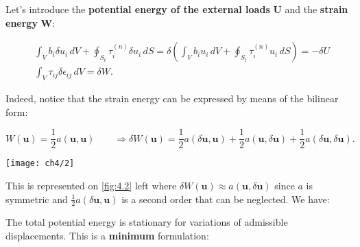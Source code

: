 	Let's introduce the \textbf{potential energy of the external loads} $\bm{U}$ and the \textbf{strain energy} $\bm{W}$:
	
	\begin{equation}
	\begin{aligned}
	&\int _V b_i \delta u_i \, dV +\oint _{S_t} \tau _{i}^{(n)} \delta u_i \, dS = \delta \left( \int _V b_i u_i \, dV +\oint _{S_t} \tau _{i}^{(n)} u_i \, dS \right)= - \delta U \\
	&\int _V \tau _{ij} \delta\epsilon_{ij} \, dV = \delta W.
	\end{aligned}
	\end{equation}
	
	Indeed, notice that the strain energy can be expressed by means of the bilinear form:
	
	\begin{equation}
	W(\bm{u}) = \frac{1}{2} a(\bm{u},\bm{u}) \qquad \Rightarrow \delta W(\bm{u}) = \frac{1}{2}a(\delta \bm{u}, \bm{u}) + \frac{1}{2}a(\bm{u}, \delta\bm{u}) +\frac{1}{2}a(\delta \bm{u}, \delta \bm{u}). 
	\end{equation}
	
	\begin{center}
	\texttt{[image: ch4/2]}
	\label{fig:4.2}
	\end{center}
	
	This is represented on \autoref{fig:4.2} left where $\delta W(\bm{u}) \approx a(\bm{u}, \delta \bm{u})$ since $a$ is symmetric and $\frac{1}{2}a(\delta \bm{u}, \bm{u})$ is a second order that can be neglected. We have:
	
	\begin{center}
	\end{center}
	
	The total potential energy is stationary for variations of admissible displacements. This is a \textbf{minimum} formulation:
	
